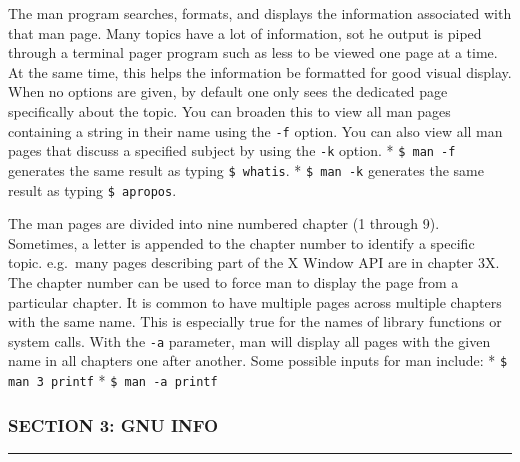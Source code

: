 The man program searches, formats, and displays the information
associated with that man page. Many topics have a lot of information,
sot he output is piped through a terminal pager program such as less to
be viewed one page at a time. At the same time, this helps the
information be formatted for good visual display. When no options are
given, by default one only sees the dedicated page specifically about
the topic. You can broaden this to view all man pages containing a
string in their name using the \texttt{-f} option. You can also view all
man pages that discuss a specified subject by using the \texttt{-k}
option. * \texttt{\$ man -f} generates the same result as typing
\texttt{\$ whatis}. * \texttt{\$ man -k} generates the same result as
typing \texttt{\$ apropos}.

The man pages are divided into nine numbered chapter (1 through 9).
Sometimes, a letter is appended to the chapter number to identify a
specific topic. e.g.~many pages describing part of the X Window API are
in chapter 3X. The chapter number can be used to force man to display
the page from a particular chapter. It is common to have multiple pages
across multiple chapters with the same name. This is especially true for
the names of library functions or system calls. With the \texttt{-a}
parameter, man will display all pages with the given name in all
chapters one after another. Some possible inputs for man include: *
\texttt{\$ man 3 printf} * \texttt{\$ man -a printf}

\subsubsection{SECTION 3: GNU INFO}\label{section-3-gnu-info}

\begin{center}\rule{3in}{0.4pt}\end{center}

